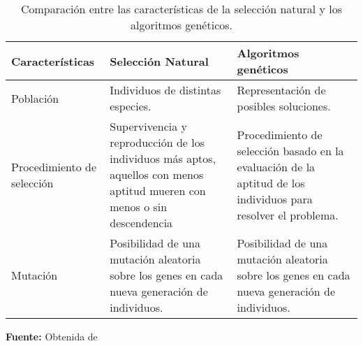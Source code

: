 \documentclass[10pt,twocolumn,a4paper]{articuloAPA}
\begin{document}
\begin{table}
	\scriptsize
	\centering
	\begin{threeparttable}
		\caption{Comparación entre las características de la selección natural y los algoritmos genéticos.}
		\label{tab:selecvsga}
		\begin{tabular}{p{0.2\tablelength}|p{0.4\tablelength}p{0.4\tablelength}}
			\hline
          Características
        & Selección Natural
        & Algoritmos genéticos \\
			\hline
          Población
        & Individuos de distintas especies.
        & Representación de posibles soluciones. \\

          Procedimiento de selección 
        & Supervivencia y reproducción de los individuos más aptos, aquellos con menos aptitud mueren con menos o sin descendencia 
        & Procedimiento de selección basado en la evaluación de la aptitud de los individuos para resolver el problema. \\

           Mutación 
        & Posibilidad de una mutación aleatoria sobre los genes en cada nueva generación de individuos. 
        & Posibilidad de una mutación aleatoria sobre los genes en cada nueva generación de individuos. \\
			\hline
		\end{tabular}
		\begin{tablenotes}
			\item {\scriptsize \textbf{Fuente:} Obtenida de \textcite{alfaro2021}}
		\end{tablenotes}
		\end{threeparttable}
	\end{table}	

\end{document}
